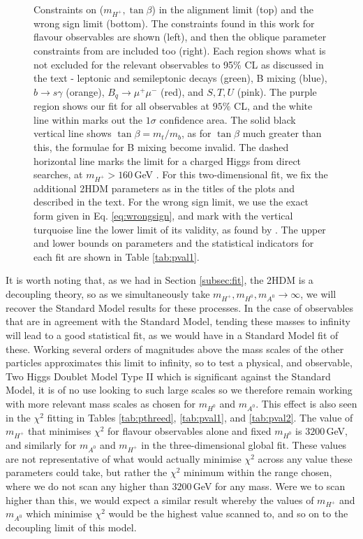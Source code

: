 \documentclass[a4paper,12pt]{article}
\begin{document}
\begin{figure}[ht]
    \caption{\label{fig:global}Constraints on ($m_{H^+},\tan\beta$) in the alignment limit (top) and the wrong sign limit (bottom). 
    The constraints found in this work for flavour observables are shown (left), and then the oblique parameter constraints from \cite{james} are included too (right). 
    Each region shows what is not excluded for the relevant observables to 95\% CL as discussed in the text - leptonic and semileptonic decays (green), B mixing (blue), $b\to s\gamma$ (orange), $B_q\to\mu^+\mu^-$ (red), and $S,T,U$ (pink).
    The purple region shows our fit for all observables at $95\%$ CL, and the white line within marks out the $1\sigma$ confidence area. 
    The solid black vertical line shows $\tan\beta=m_t/m_b$, as for $\tan\beta$ much greater than this, the formulae for B mixing become invalid. 
    The dashed horizontal line marks the limit for a charged Higgs from direct searches, at $m_{H^+}>160\,$GeV \cite{dirhp}.
    For this two-dimensional fit, we fix the additional 2HDM parameters as in the titles of the plots and described in the text. 
    For the wrong sign limit, we use the exact form given in Eq. \ref{eq:wrongsign}, and mark with the vertical turquoise line the lower limit of its validity, as found by \cite{oliver}.
    The upper and lower bounds on parameters and the statistical indicators for each fit are shown in Table \ref{tab:pval1}.}
\end{figure}

It is worth noting that, as we had in Section \ref{subsec:fit}, the 2HDM is a decoupling theory, so as we simultaneously take $m_{H^+},m_{H^0},m_{A^0}\to\infty$, we will recover the Standard Model results for these processes.
In the case of observables that are in agreement with the Standard Model, tending these masses to infinity will lead to a good statistical fit, as we would have in a Standard Model fit of these. 
Working several orders of magnitudes above the mass scales of the other particles approximates this limit to infinity, so to test a physical, and observable, Two Higgs Doublet Model Type II which is significant against the Standard Model, it is of no use looking to such large scales so we therefore remain working with more relevant mass scales as chosen for $m_{H^0}$ and $m_{A^0}$.
This effect is also seen in the $\chi^2$ fitting in Tables \ref{tab:pthreed}, \ref{tab:pval1}, and \ref{tab:pval2}. 
The value of $m_{H^+}$ that minimises $\chi^2$ for flavour observables alone and fixed $m_{H^0}$ is $3200\,$GeV, and similarly for $m_{A^0}$ and $m_{H^+}$ in the three-dimensional global fit. 
These values are not representative of what would actually minimise $\chi^2$ across any value these parameters could take, but rather the $\chi^2$ minimum within the range chosen, where we do not scan any higher than $3200\,$GeV for any mass. 
Were we to scan higher than this, we would expect a similar result whereby the values of $m_{H^+}$ and $m_{A^0}$ which minimise $\chi^2$ would be the highest value scanned to, and so on to the decoupling limit of this model. 
\end{document}
